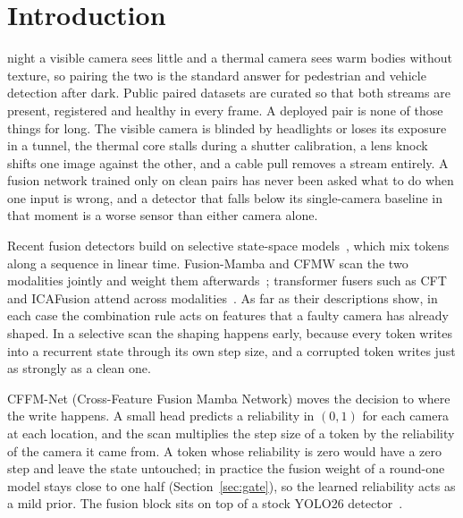 \section{Introduction}
\label{sec:intro}
 night a visible camera sees little and a thermal camera sees warm bodies without texture, so pairing the two is the standard answer for pedestrian and vehicle detection after dark. Public paired datasets are curated so that both streams are present, registered and healthy in every frame. A deployed pair is none of those things for long. The visible camera is blinded by headlights or loses its exposure in a tunnel, the thermal core stalls during a shutter calibration, a lens knock shifts one image against the other, and a cable pull removes a stream entirely. A fusion network trained only on clean pairs has never been asked what to do when one input is wrong, and a detector that falls below its single-camera baseline in that moment is a worse sensor than either camera alone.

Recent fusion detectors build on selective state-space models~\cite{gu2023mamba}, which mix tokens along a sequence in linear time. Fusion-Mamba and CFMW scan the two modalities jointly and weight them afterwards~\cite{dong2025fusionmamba,li2025cfmw}; transformer fusers such as CFT and ICAFusion attend across modalities~\cite{fang2021cft,shen2024icafusion}. As far as their descriptions show, in each case the combination rule acts on features that a faulty camera has already shaped. In a selective scan the shaping happens early, because every token writes into a recurrent state through its own step size, and a corrupted token writes just as strongly as a clean one.

CFFM-Net (Cross-Feature Fusion Mamba Network) moves the decision to where the write happens. A small head predicts a reliability in $(0,1)$ for each camera at each location, and the scan multiplies the step size of a token by the reliability of the camera it came from. A token whose reliability is zero would have a zero step and leave the state untouched; in practice the fusion weight of a round-one model stays close to one half (Section~\ref{sec:gate}), so the learned reliability acts as a mild prior. The fusion block sits on top of a stock YOLO26 detector~\cite{yolo26_2026}.

